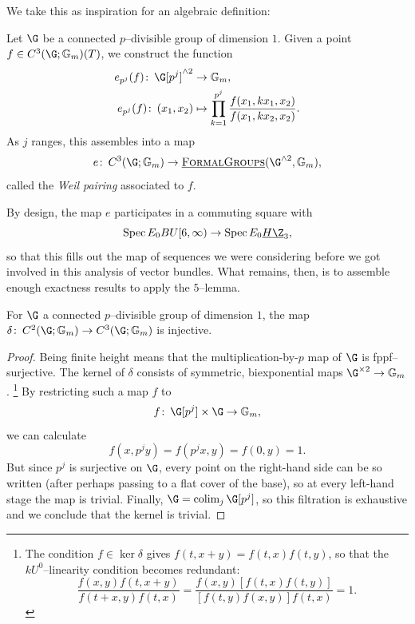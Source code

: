 We take this as inspiration for an algebraic definition:

\begin{definition}
Let \(\G\) be a connected \(p\)--divisible group of dimension \(1\).
Given a point \(f \in C^3(\G; \Gm)(T)\), we construct the function
\begin{align*}
e_{p^j}(f)\co \G[p^j]^{\sm 2} & \to \Gm, \\
e_{p^j}(f)\co (x_1, x_2) & \mapsto \prod_{k=1}^{p^j} \frac{f(x_1, kx_1, x_2)}{f(x_1, kx_2, x_2)}.
\end{align*}
As \(j\) ranges, this assembles into a map \[e\co C^3(\G; \Gm) \to \InternalHom{FormalGroups}(\G^{\sm 2}, \Gm),\] called the \textit{Weil pairing} associated to \(f\).
\end{definition}

By design, the map \(e\) participates in a commuting square with \[\Spec E_0 BU[6, \infty) \to \Spec E_0 \OS{H\Z}{3},\] so that this fills out the map of sequences we were considering before we got involved in this analysis of vector bundles.
What remains, then, is to assemble enough exactness results to apply the \(5\)--lemma.

\begin{lemma}
For \(\G\) a connected \(p\)--divisible group of dimension \(1\), the map \(\delta\co C^2(\G; \Gm) \to C^3(\G; \Gm)\) is injective.
\end{lemma}
\begin{proof}
Being finite height means that the multiplication-by-\(p\) map of \(\G\) is fppf--surjective.
The kernel of \(\delta\) consists of symmetric, biexponential maps \(\G^{\times 2} \to \Gm\).%
\footnote{%
The condition \(f \in \ker \delta\) gives \(f(t, x+y) = f(t, x) f(t, y)\), so that the \(kU^0\)--linearity condition becomes redundant: \[\frac{f(x, y) f(t, x+y)}{f(t+x, y) f(t, x)} = \frac{f(x, y) [f(t, x) f(t, y)]}{[f(t, y) f(x, y)] f(t, x)} = 1.\]
}
By restricting such a map \(f\) to \[f \co \G[p^j] \times \G \to \Gm,\] we can calculate \[f(x, p^j y) = f(p^j x, y) = f(0, y) = 1.\]
But since \(p^j\) is surjective on \(\G\), every point on the right-hand side can be so written (after perhaps passing to a flat cover of the base), so at every left-hand stage the map is trivial.
Finally, \(\G = \colim_j \G[p^j]\), so this filtration is exhaustive and we conclude that the kernel is trivial.
\end{proof}

